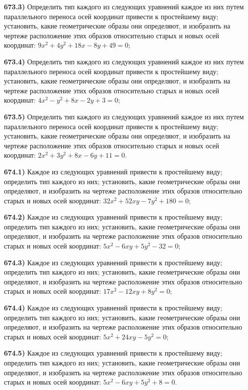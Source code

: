 \textbf{673.3)} Определить тип каждого из следующих уравнений каждое из них путем параллельного переноса осей координат привести к простейшему виду; установить, какие геометрические образы они определяют, и изобразить на чертеже расположение этих образов относительно старых и новых осей координат: $9 x^2+4 y^2+18 x-8 y+49=0$;

\textbf{673.4)} Определить тип каждого из следующих уравнений каждое из них путем параллельного переноса осей координат привести к простейшему виду; установить, какие геометрические образы они определяют, и изобразить на чертеже расположение этих образов относительно старых и новых осей координат: $4 x^2-y^2+8 x-2 y+3=0$;

\textbf{673.5)} Определить тип каждого из следующих уравнений каждое из них путем параллельного переноса осей координат привести к простейшему виду; установить, какие геометрические образы они определяют, и изобразить на чертеже расположение этих образов относительно старых и новых осей координат: $2 x^2+3 y^2+8 x-6 y+11=0$.

\textbf{674.1)} Каждое из следующих уравнений привести к простейшему виду; определить тип каждого из них; установить, какие геометрические образы они определяют, и изобразить на чертеже расположение этих образов относительно старых и новых осей координат: $32 x^2+52 x y-7 y^2+180=0$;

\textbf{674.2)} Каждое из следующих уравнений привести к простейшему виду; определить тип каждого из них; установить, какие геометрические образы они определяют, и изобразить на чертеже расположение этих образов относительно старых и новых осей координат: $5 x^2-6 x y+5 y^2-32=0$;

\textbf{674.3)} Каждое из следующих уравнений привести к простейшему виду; определить тип каждого из них; установить, какие геометрические образы они определяют, и изобразить на чертеже расположение этих образов относительно старых и новых осей координат: $17 x^2-12 x y+8 y^2=0$;

\textbf{674.4)} Каждое из следующих уравнений привести к простейшему виду; определить тип каждого из них; установить, какие геометрические образы они определяют, и изобразить на чертеже расположение этих образов относительно старых и новых осей координат: $5 x^2+24 x y-5 y^2=0$;

\textbf{674.5)} Каждое из следующих уравнений привести к простейшему виду; определить тип каждого из них; установить, какие геометрические образы они определяют, и изобразить на чертеже расположение этих образов относительно старых и новых осей координат: $5 x^2-6 x y+5 y^2+8=0$.



